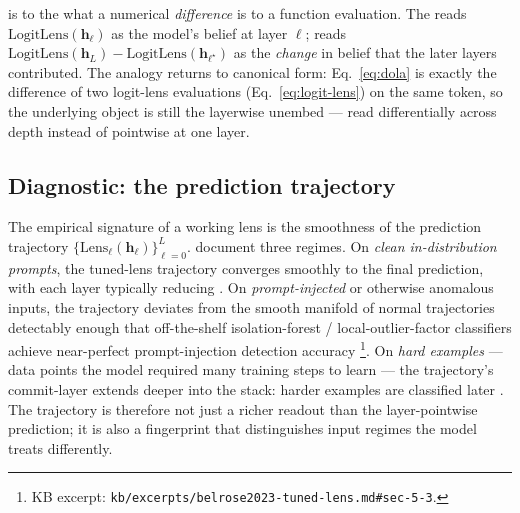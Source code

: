 \begin{analogy}
 is to the  what a numerical \emph{difference} is to a
function evaluation. The  reads
$\mathrm{LogitLens}(\mathbf{h}_\ell)$ as the model's belief at layer
$\ell$;  reads
$\mathrm{LogitLens}(\mathbf{h}_L) - \mathrm{LogitLens}(\mathbf{h}_{\ell^\star})$
as the \emph{change} in belief that the later layers contributed. The
analogy returns to canonical form: Eq.~\eqref{eq:dola} is exactly the
difference of two logit-lens evaluations
(Eq.~\eqref{eq:logit-lens}) on the same token, so the underlying
object is still the layerwise unembed — read differentially across
depth instead of pointwise at one layer.
\end{analogy}

\subsection{Diagnostic: the prediction trajectory}
\label{sec:lens-trajectory}

The empirical signature of a working lens is the smoothness of the
prediction trajectory $\{\mathrm{Lens}_\ell(\mathbf{h}_\ell)\}_{\ell=0}^L$.
\citet[\S 1]{belrose2023-tuned-lens} document three regimes. On
\emph{clean in-distribution prompts}, the tuned-lens trajectory
converges smoothly to the final prediction, with each layer typically
reducing . On \emph{prompt-injected} or otherwise anomalous
inputs, the trajectory deviates from the smooth manifold of normal
trajectories detectably enough that off-the-shelf isolation-forest /
local-outlier-factor classifiers achieve near-perfect prompt-injection
detection accuracy \citep[\S 5.3]{belrose2023-tuned-lens}\footnote{KB
excerpt: \nolinkurl{kb/excerpts/belrose2023-tuned-lens.md#sec-5-3}.}. On
\emph{hard examples} — data points the model required many training
steps to learn — the trajectory's commit-layer extends deeper into the
stack: harder examples are classified later
\citep[\S 5.4]{belrose2023-tuned-lens}. The trajectory is therefore
not just a richer readout than the layer-pointwise prediction; it is
also a fingerprint that distinguishes input regimes the model treats
differently.

